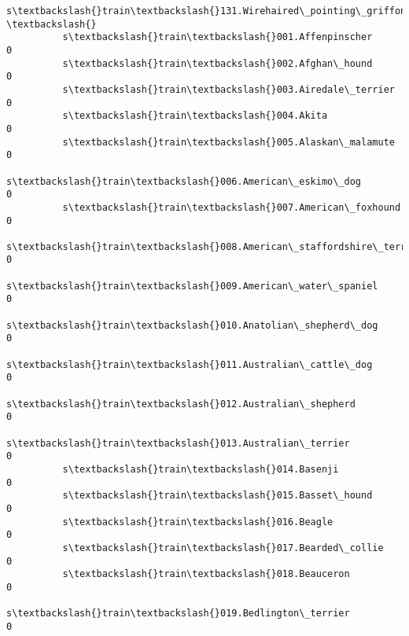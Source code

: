 \documentclass[11pt]{article}
\begin{document}
\begin{Verbatim}[commandchars=\\\{\}]
                                                          s\textbackslash{}train\textbackslash{}131.Wirehaired\_pointing\_griffon  \textbackslash{}
          s\textbackslash{}train\textbackslash{}001.Affenpinscher                                                             0   
          s\textbackslash{}train\textbackslash{}002.Afghan\_hound                                                              0   
          s\textbackslash{}train\textbackslash{}003.Airedale\_terrier                                                          0   
          s\textbackslash{}train\textbackslash{}004.Akita                                                                     0   
          s\textbackslash{}train\textbackslash{}005.Alaskan\_malamute                                                          0   
          s\textbackslash{}train\textbackslash{}006.American\_eskimo\_dog                                                       0   
          s\textbackslash{}train\textbackslash{}007.American\_foxhound                                                         0   
          s\textbackslash{}train\textbackslash{}008.American\_staffordshire\_terrier                                            0   
          s\textbackslash{}train\textbackslash{}009.American\_water\_spaniel                                                    0   
          s\textbackslash{}train\textbackslash{}010.Anatolian\_shepherd\_dog                                                    0   
          s\textbackslash{}train\textbackslash{}011.Australian\_cattle\_dog                                                     0   
          s\textbackslash{}train\textbackslash{}012.Australian\_shepherd                                                       0   
          s\textbackslash{}train\textbackslash{}013.Australian\_terrier                                                        0   
          s\textbackslash{}train\textbackslash{}014.Basenji                                                                   0   
          s\textbackslash{}train\textbackslash{}015.Basset\_hound                                                              0   
          s\textbackslash{}train\textbackslash{}016.Beagle                                                                    0   
          s\textbackslash{}train\textbackslash{}017.Bearded\_collie                                                            0   
          s\textbackslash{}train\textbackslash{}018.Beauceron                                                                 0   
          s\textbackslash{}train\textbackslash{}019.Bedlington\_terrier                                                        0   

\end{Verbatim}
\end{document}
